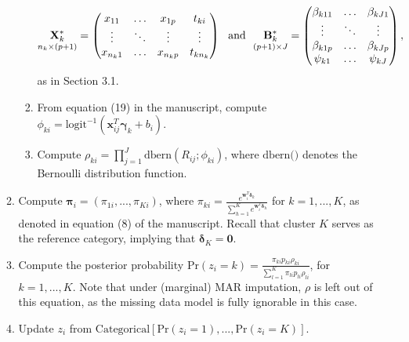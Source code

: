 \documentclass[useAMS,11pt]{article}
\newcommand{\1}{\mathbbm{1}}
\begin{document}
\begin{enumerate}
\begin{enumerate}
\begin{enumerate}
\[
\underset{n_k\times(p+1)}{\mathbf{X}^*_k}=\begin{pmatrix}x_{11} & \ldots & x_{1p} & t_{ki}\\
              \vdots & \ddots & \vdots & \vdots\\
              x_{n_k1} & \ldots & x_{n_kp} & t_{kn_k}\end{pmatrix}
 ~~\text{and}~~
\underset{(p+1)\times J}{\mathbf{B}^*_k}=\begin{pmatrix} \beta_{k11} & \ldots & \beta_{kJ1}\\
              \vdots & \ddots & \vdots \\
              \beta_{k1p} & \ldots & \beta_{kJp} \\
		  \psi_{k1} & \ldots & \psi_{kJ}\end{pmatrix},\vspace{6pt}
\]
as in Section 3.1.
			\item From equation (19) in the manuscript, compute $\phi_{ki} = \text{logit}^{-1}(\mathbf{x}_{ij}^T \boldsymbol\gamma_k + b_i)$.
			\item Compute $\rho_{ki} = \prod_{j = 1}^J \text{dbern}(R_{ij};\phi_{ki})$, where $\text{dbern()}$ denotes the Bernoulli distribution function.
		\end{enumerate}
		\item Compute $\boldsymbol\pi_i = (\pi_{1i},...,\pi_{Ki})$, where $\pi_{ki} = \frac{e^{\mathbf{w}_i^T \boldsymbol\delta_k}}{\sum_{h = 1}^K e^{\mathbf{w}_i^T \boldsymbol\delta_h}}$ for $k = 1,...,K$, as denoted in equation (8) of the manuscript. Recall that cluster $K$ serves as the reference category, implying that $\boldsymbol\delta_K=\boldsymbol0$.
		\item Compute the posterior probability $\text{Pr}(z_i = k) = \frac{\pi_{ki}p_{ki}\rho_{ki}}{\sum_{l = 1}^K \pi_{li}p_{li}\rho_{li}}$, for $k = 1,...,K$. Note that under (marginal) MAR imputation, $\rho$ is left out of this equation, as the missing data model is fully ignorable in this case.
		\item Update $z_i$ from $\text{Categorical}[\text{Pr}(z_i = 1),...,\text{Pr}(z_i = K)]$.
	\end{enumerate}
	

\end{enumerate}
\end{document}
